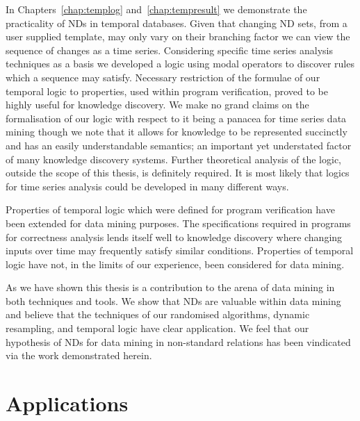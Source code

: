 \medskip

In Chapters~\ref{chap:templog} and~\ref{chap:tempresult} we
demonstrate the practicality of NDs in temporal databases. Given that
changing ND sets, from a user supplied template, may only vary on
their branching factor we can view the sequence of changes as a time
series. Considering specific time series analysis techniques as a
basis we developed a logic using modal operators to discover rules
which a sequence may satisfy. Necessary restriction of the formulae of
our temporal logic to properties, used within program verification,
proved to be highly useful for knowledge discovery. We make no grand
claims on the formalisation of our logic with respect to it being a
panacea for time series data mining though we note that it allows for
knowledge to be represented succinctly and has an easily
understandable semantics; an important yet understated factor of many
knowledge discovery systems. Further theoretical analysis of the
logic, outside the 
scope of this thesis, is definitely required. It is most likely that
logics for time series analysis could be developed in many different
ways.

\medskip

Properties of temporal logic which were defined for program
verification have been extended for data mining purposes. The
specifications required in programs for correctness analysis lends
itself well to knowledge discovery where changing inputs over time may
frequently satisfy similar conditions. Properties of temporal logic
have not, in the limits of our experience, been considered for data
mining. 

\medskip

As we have shown this thesis is a contribution to the arena of data
mining in both techniques and tools. We show that NDs are valuable within
data mining and believe that the techniques of our randomised algorithms,
dynamic resampling, and temporal logic have clear application.  We feel
that our hypothesis of NDs for data mining in non-standard relations
has been vindicated via the work demonstrated herein.

\section{Applications}

